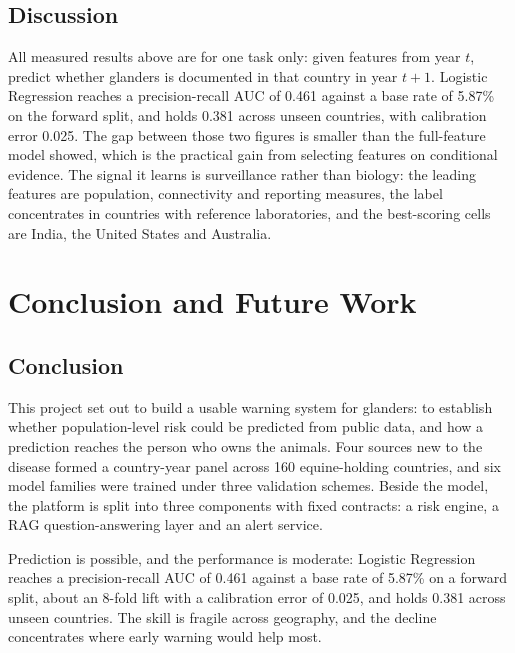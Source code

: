 \documentclass[10pt,openany]{report}
\begin{document}
\section{Discussion}

All measured results above are for one task only: given features from year $t$, predict whether
glanders is documented in that country in year $t{+}1$. Logistic Regression reaches a
precision-recall AUC of 0.461 against a base rate of 5.87\% on the forward split, and holds 0.381
across unseen countries, with calibration error 0.025. The gap between those two figures is smaller
than the full-feature model showed, which is the practical gain from selecting features on
conditional evidence. The signal it learns is surveillance rather than biology: the leading features
are population, connectivity and reporting measures, the label concentrates in countries with
reference laboratories, and the best-scoring cells are India, the United States and Australia.

\chapter{Conclusion and Future Work}
\label{ch:concl}

\section{Conclusion}

This project set out to build a usable warning system for glanders: to establish whether
population-level risk could be predicted from public data, and how a prediction reaches the person who
owns the animals. Four sources new to the disease formed a country-year panel across 160
equine-holding countries, and six model families were trained under three validation schemes. Beside
the model, the platform is split into three components with fixed contracts: a risk engine, a RAG
question-answering layer and an alert service.

Prediction is possible, and the performance is moderate: Logistic Regression reaches a
precision-recall AUC of 0.461 against a base rate of 5.87\% on a forward split, about an 8-fold lift
with a calibration error of 0.025, and holds 0.381 across unseen countries. The skill is fragile
across geography, and the decline concentrates where early warning would help most.
\end{document}
